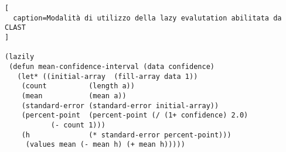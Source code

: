 \begin{lstlisting}[
  caption=Modalità di utilizzo della lazy evalutation abilitata da CLAST
]

(lazily
 (defun mean-confidence-interval (data confidence)
   (let* ((initial-array  (fill-array data 1))
    (count          (length a))
    (mean           (mean a))
    (standard-error (standard-error initial-array))
    (percent-point  (percent-point (/ (1+ confidence) 2.0)
           (- count 1)))
    (h              (* standard-error percent-point)))
     (values mean (- mean h) (+ mean h)))))

\end{lstlisting}
